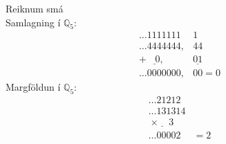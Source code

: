 \begin{daemi}
Reiknum smá \\
Samlagning í $\mathbb{Q}_5$:\\
\begin{align*}
\ldots 1111111\ &1 \\
\ldots 4444444,&44 \\
+\ \underline{\mbox{          } 0},&\underline{01} \\
\ldots 0000000,&00 = 0
\end{align*}
Margföldun í $\mathbb{Q}_5$:\\
\begin{align*}
\ldots 21212\ \ & \\
\ldots 131314& \\
\ \underline{\times \ \ \ \ \  3}& \\
\ldots 00002 &= 2
\end{align*}


\end{daemi}

